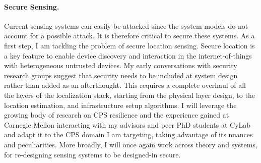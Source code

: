\documentclass[10pt]{article}
\begin{document}
\paragraph{Secure Sensing. }
Current sensing systems can easily be attacked since the system models do not account for a possible attack. It is therefore critical to secure these systems. As a first step, I am tackling the problem of secure location sensing. Secure location is a key feature to enable device discovery and interaction in the internet-of-things with heterogeneous untrusted devices. My early conversations with security research groups suggest that security needs to be included at system design rather than added as an afterthought. This requires a complete overhaul of all the layers of the localization stack, starting from the physical layer design, to the location estimation, and infrastructure setup algorithms. I will leverage the growing body of research on CPS resilience and the experience gained at Carnegie Mellon interacting with my advisors and peer PhD students at CyLab and adapt it to the CPS domain I am targeting, taking advantage of its nuances and peculiarities.  More broadly, I will once again work across theory and systems, for re-designing sensing systems to be designed-in secure. 

\end{document}
